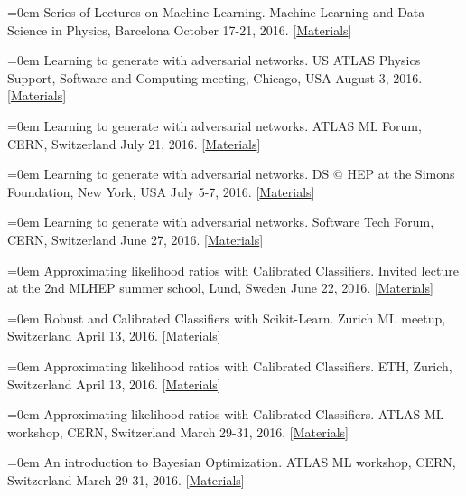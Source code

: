 \documentclass{scrartcl}
\newcommand{\MarginText}[1]{\marginpar{\raggedleft\itshape\small#1}}
\newcommand{\NewPublication}[4]{\noindent\hangindent=0em\hangafter=0 \MarginText{\color{black} #1}{\footnotesize [{\color{Maroon}#2}]} #3 {\footnotesize\color{gray}#4}\vspace{0.5em}}
\begin{document}
\begin{cv}{}
\NewPublication{}{31}{Series of Lectures on Machine Learning.}{%
Machine Learning and Data Science in Physics, Barcelona
October 17-21, 2016.
[\href{https://github.com/iccub-ml/lectures-glouppe}{Materials}]}

\NewPublication{}{30}{Learning to generate with adversarial networks.}{%
US ATLAS Physics Support, Software and Computing meeting, Chicago, USA
August 3, 2016.
[\href{https://indico.cern.ch/event/526308/}{Materials}]}

\NewPublication{}{29}{Learning to generate with adversarial networks.}{%
ATLAS ML Forum, CERN, Switzerland
July 21, 2016.
[\href{https://indico.cern.ch/event/556591/}{Materials}]}

\NewPublication{}{28}{Learning to generate with adversarial networks.}{%
DS @ HEP at the Simons Foundation, New York, USA
July 5-7, 2016.
[\href{https://indico.hep.caltech.edu/indico/conferenceTimeTable.py?confId=102}{Materials}]}

\NewPublication{}{27}{Learning to generate with adversarial networks.}{%
Software Tech Forum, CERN, Switzerland
June 27, 2016.
[\href{https://indico.cern.ch/event/544644/contributions/2210328/attachments/1299201/1938586/slides.pdf}{Materials}]}

\NewPublication{}{26}{Approximating likelihood ratios with Calibrated Classifiers.}{%
Invited lecture at the 2nd MLHEP summer school, Lund, Sweden
June 22, 2016.
[\href{https://github.com/glouppe/talk-approximating-likelihood-ratios-with-classifiers}{Materials}]}

\NewPublication{}{25}{Robust and Calibrated Classifiers with Scikit-Learn.}{%
Zurich ML meetup, Switzerland
April 13, 2016.
[\href{https://github.com/glouppe/tutorials-scikit-learn}{Materials}]}

\NewPublication{}{24}{Approximating likelihood ratios with Calibrated Classifiers.}{%
ETH, Zurich, Switzerland
April 13, 2016.
[\href{https://github.com/glouppe/talk-approximating-likelihood-ratios-with-classifiers}{Materials}]}

\NewPublication{}{23}{Approximating likelihood ratios with Calibrated Classifiers.}{%
ATLAS ML workshop, CERN, Switzerland
March 29-31, 2016.
[\href{https://github.com/glouppe/talk-approximating-likelihood-ratios-with-classifiers}{Materials}]}

\NewPublication{}{22}{An introduction to Bayesian Optimization.}{%
ATLAS ML workshop, CERN, Switzerland
March 29-31, 2016.
[\href{https://github.com/glouppe/talk-bayesian-optimisation}{Materials}]}


\end{cv}
\end{document}
